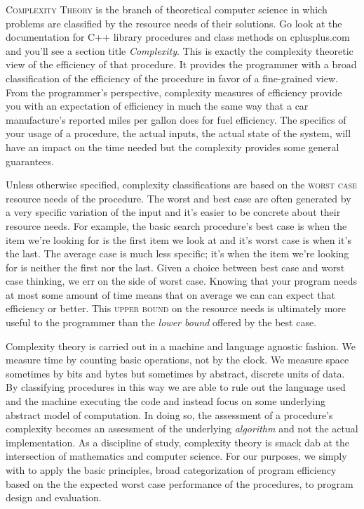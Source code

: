 \documentclass[]{tufte-handout}
\begin{document}
\textsc{Complexity Theory} is the branch of theoretical computer science in which problems are classified by the resource needs of their solutions.  Go look at the documentation for C++ library procedures and class methods on cplusplus.com and you'll see a section title \textit{Complexity}.  This is exactly the complexity theoretic view of the efficiency of that procedure. It provides the programmer with a broad classification of the efficiency of the procedure in favor of a fine-grained view. From the programmer's perspective, complexity measures of efficiency provide you with an expectation of efficiency in much the same way that a car manufacture's reported miles per gallon does for fuel efficiency. The specifics of your usage of a procedure, the actual inputs, the actual state of the system, will have an impact on the time needed but the complexity provides some general guarantees. 

Unless otherwise specified, complexity classifications are based on the \textsc{worst case} resource needs of the procedure. The worst and best case are often generated by a very specific variation of the input and it's easier to be concrete about their resource needs. For example, the basic search procedure's best case is when the item we're looking for is the first item we look at and it's worst case is when it's the last. The average case is much less specific; it's when the item we're looking for is neither the first nor the last.  Given a choice between best case and worst case thinking, we err on the side of worst case.  Knowing that your program needs at most some amount of time means that on average we can can expect that efficiency or better.  This \textsc{upper bound} on the resource needs is ultimately more useful to the programmer than the \textit{lower bound} offered by the best case. 

Complexity theory is carried out in a machine and language agnostic fashion. We measure time by counting basic operations, not by the clock. We measure space sometimes by bits and bytes but sometimes by abstract, discrete units of data. By classifying procedures in this way we are able to rule out the language used and the machine executing the code and instead focus on some underlying abstract model of computation. In doing so, the assessment of a procedure's complexity becomes an assessment of the underlying \textit{algorithm} and not the actual implementation. As a discipline of study, complexity theory is smack dab at the intersection of mathematics and computer science. For our purposes, we simply with to apply the basic principles, broad categorization of program efficiency based on the the expected worst case performance of the procedures, to program design and evaluation. 
\end{document}
